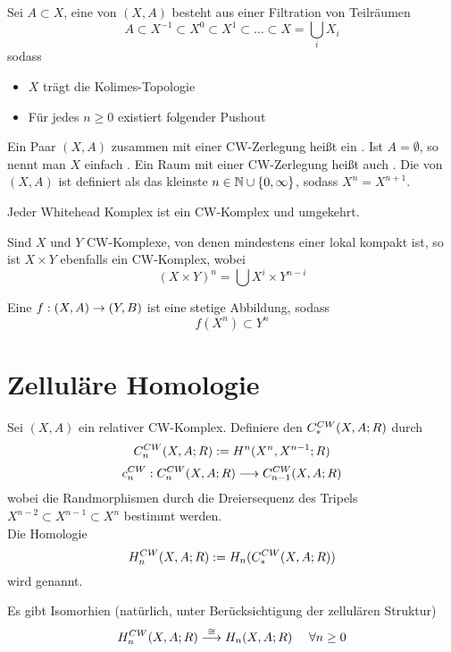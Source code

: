 \Def{}
Sei $A \subset X$, eine  von $(X,A)$ besteht aus einer Filtration von Teilräumen
\[ A \subset X^{-1} \subset X^0 \subset X^1 \subset \ldots \subset X = \bigcup_i X_i \]
sodass
\begin{itemize}
\item $X$ trägt die {Kolimes-Topologie}
\item Für jedes $n \geq 0$ existiert folgender Pushout
\begin{center}
\end{center}
\end{itemize}
Ein Paar $(X,A)$ zusammen mit einer CW-Zerlegung heißt ein . Ist $A = \emptyset$, so nennt man $X$ einfach . Ein Raum mit einer CW-Zerlegung heißt auch . Die  von $(X,A)$ ist definiert als das kleinste $n \in \mathbb{N}\cup\{0,\infty\}$, sodass $X^{n} = X^{n+1}$.

\Satz{}
Jeder Whitehead Komplex ist ein CW-Komplex und umgekehrt.

\Satz{}
Sind $X$ und $Y$ CW-Komplexe, von denen mindestens einer lokal kompakt ist, so ist $X \times Y$ ebenfalls ein CW-Komplex, wobei
\[ (X \times Y)^n = \bigcup X^i \times Y^{n-i}  \]

\Def{}
Eine  $f : (X,A) \overset{}{\rightarrow} (Y,B)$ ist eine stetige Abbildung, sodass
\[ f(X^n) \subset Y^n \]

\section{Zelluläre Homologie}
\Def{}
Sei $(X,A)$ ein relativer CW-Komplex. Definiere den  $C^{CW}_{*}(X,A;R)$ durch
\[ C^{CW}_{n}(X,A;R) := H^n(X^n, X^{n-1}; R)  \]
\[{c^{CW}_{n}}: {C^{CW}_{n}(X,A;R)}\overset{}{\longrightarrow}{C^{CW}_{n - 1}(X,A;R)}\]
wobei die Randmorphismen durch die Dreiersequenz des Tripels $X^{n-2} \subset X^{n-1} \subset X^n $ bestimmt werden.\\
Die Homologie
\[H^{CW}_{n}(X,A; R) := H_n(C^{CW}_{*}(X, A; R)) \]
wird  genannt.

\Satz{}
Es gibt Isomorhien (natürlich, unter Berücksichtigung der zellulären Struktur)
\[ H^{CW}_{n}(X, A;R) \overset{\cong}{\longrightarrow} H_n(X,A;R) ~~~~ \forall n \geq 0 \]

